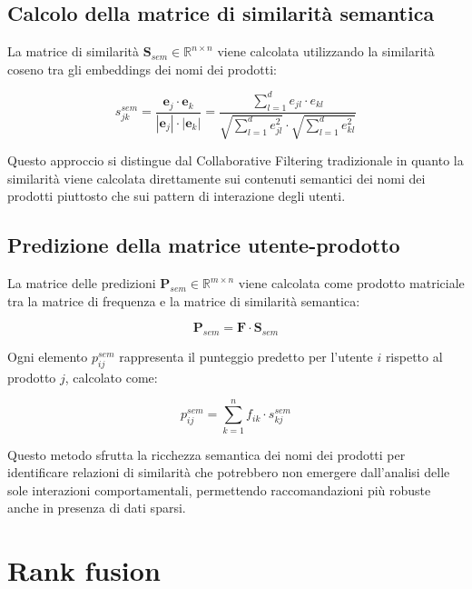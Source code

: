 \subsection{Calcolo della matrice di similarità semantica}

La matrice di similarità $\mathbf{S}_{sem} \in \mathbb{R}^{n \times n}$ viene calcolata utilizzando la similarità coseno tra gli embeddings dei nomi dei prodotti:

\begin{equation}
s_{jk}^{sem} = \frac{\mathbf{e}_j \cdot \mathbf{e}_k}{|\mathbf{e}_j| \cdot |\mathbf{e}_k|} = \frac{\sum_{l=1}^{d} e_{jl} \cdot e_{kl}}{\sqrt{\sum_{l=1}^{d} e_{jl}^2} \cdot \sqrt{\sum_{l=1}^{d} e_{kl}^2}}
\end{equation}

Questo approccio si distingue dal Collaborative Filtering tradizionale in quanto la similarità viene calcolata direttamente sui contenuti semantici dei nomi dei prodotti piuttosto che sui pattern di interazione degli utenti.

\subsection{Predizione della matrice utente-prodotto}

La matrice delle predizioni $\mathbf{P}_{sem} \in \mathbb{R}^{m \times n}$ viene calcolata come prodotto matriciale tra la matrice di frequenza e la matrice di similarità semantica:

\begin{equation}
\mathbf{P}_{sem} = \mathbf{F} \cdot \mathbf{S}_{sem}
\end{equation}

Ogni elemento $p_{ij}^{sem}$ rappresenta il punteggio predetto per l'utente $i$ rispetto al prodotto $j$, calcolato come:

\begin{equation}
p_{ij}^{sem} = \sum_{k=1}^{n} f_{ik} \cdot s_{kj}^{sem}
\end{equation}

Questo metodo sfrutta la ricchezza semantica dei nomi dei prodotti per identificare relazioni di similarità che potrebbero non emergere dall'analisi delle sole interazioni comportamentali, permettendo raccomandazioni più robuste anche in presenza di dati sparsi.


\section{Rank fusion}

